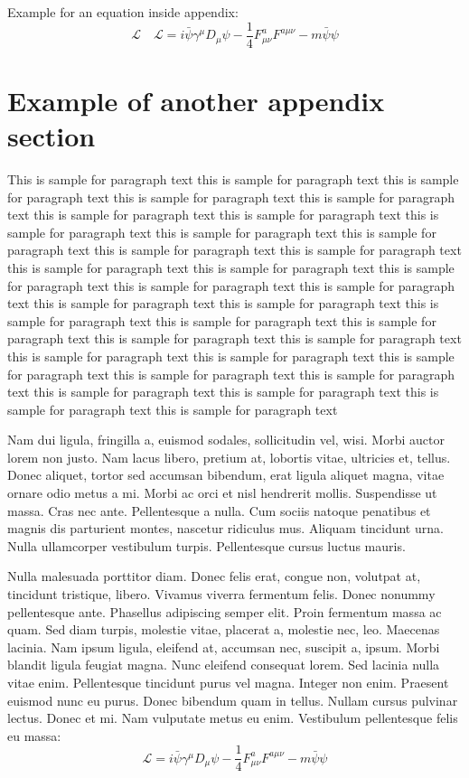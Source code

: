\documentclass[CJCE,STIX2COL]{WileyNJD-v2}
\begin{document}
Example for an equation inside appendix:
\begin{equation}
\mathcal{L}\quad \mathbf{\mathcal{L}} = i \bar{\psi} \gamma^\mu D_\mu \psi - \frac{1}{4} F_{\mu\nu}^a F^{a\mu\nu} - m \bar{\psi} \psi\label{eq25}
\end{equation}

\section{Example of another appendix section\label{app3}}%

This is sample for paragraph text this is sample for paragraph text  this is sample for paragraph text this is sample for paragraph text this is sample for paragraph text this is sample for paragraph text this is sample for paragraph text this is sample for paragraph text this is sample for paragraph text this is sample for paragraph text this is sample for paragraph text this is sample for paragraph text this is sample for paragraph text this is sample for paragraph text this is sample for paragraph text this is sample for paragraph text this is sample for paragraph text this is sample for paragraph text this is sample for paragraph text this is sample for paragraph text this is sample for paragraph text this is sample for paragraph text this is sample for paragraph text this is sample for paragraph text this is sample for paragraph text this is sample for paragraph text this is sample for paragraph text this is sample for paragraph text this is sample for paragraph text this is sample for paragraph text this is sample for paragraph text this is sample for paragraph text this is sample for paragraph text

Nam dui ligula, fringilla a, euismod sodales, sollicitudin vel, wisi. Morbi auctor lorem non justo. Nam lacus libero,
pretium at, lobortis vitae, ultricies et, tellus. Donec aliquet, tortor sed accumsan bibendum, erat ligula aliquet magna,
vitae ornare odio metus a mi. Morbi ac orci et nisl hendrerit mollis. Suspendisse ut massa. Cras nec ante. Pellentesque
a nulla. Cum sociis natoque penatibus et magnis dis parturient montes, nascetur ridiculus mus. Aliquam tincidunt
urna. Nulla ullamcorper vestibulum turpis. Pellentesque cursus luctus mauris.

Nulla malesuada porttitor diam. Donec felis erat, congue non, volutpat at, tincidunt tristique, libero. Vivamus
viverra fermentum felis. Donec nonummy pellentesque ante. Phasellus adipiscing semper elit. Proin fermentum massa
ac quam. Sed diam turpis, molestie vitae, placerat a, molestie nec, leo. Maecenas lacinia. Nam ipsum ligula, eleifend
at, accumsan nec, suscipit a, ipsum. Morbi blandit ligula feugiat magna. Nunc eleifend consequat lorem. Sed lacinia
nulla vitae enim. Pellentesque tincidunt purus vel magna. Integer non enim. Praesent euismod nunc eu purus. Donec
bibendum quam in tellus. Nullam cursus pulvinar lectus. Donec et mi. Nam vulputate metus eu enim. Vestibulum
pellentesque felis eu massa:
\begin{equation}
\mathcal{L} = i \bar{\psi} \gamma^\mu D_\mu \psi
    - \frac{1}{4} F_{\mu\nu}^a F^{a\mu\nu} - m \bar{\psi} \psi
\label{eq26}
\end{equation}
\end{document}
